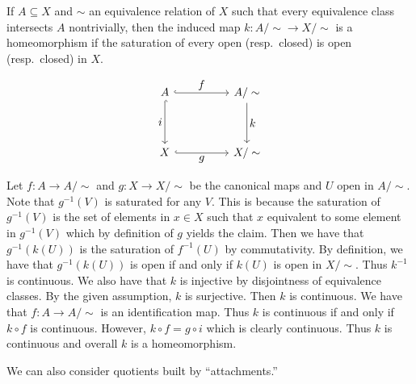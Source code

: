 \documentclass[letterpaper, 11pt, oneside]{book}
\begin{document}
\begin{prop}
  If $A \subseteq X$ and $\sim$ an equivalence relation of $X$ such that every equivalence class intersects $A$ nontrivially, then the induced map $k\colon A / \sim \to X / \sim$ is a homeomorphism if the saturation of every open (resp.\ closed) is open (resp.\ closed) in $X$.
\end{prop}
\begin{pf}
  \begin{figure}[h]
  \centering
  \[
    \begin{tikzcd}[every label/.append style={font=\normalsize}]
      A && {A/\sim} \\
      \\
      X && {X/\sim}
      \arrow["f", hook, from=1-1, to=1-3]
      \arrow["k", from=1-3, to=3-3]
      \arrow["g"', hook, from=3-1, to=3-3]
      \arrow["i"', hook, from=1-1, to=3-1]
    \end{tikzcd}
  \]
  \addtocounter{figure}{1}
  \end{figure}
  Let $f\colon A \to A / \sim$ and $g\colon X \to X / \sim$ be the canonical maps and $U$ open in $A / \sim$.
  Note that $g^{-1}(V)$ is saturated for any $V$.
  This is because the saturation of $g^{-1}(V)$ is the set of elements in $x \in X$ such that $x$ equivalent to some element in $g^{-1}(V)$ which by definition of $g$ yields the claim.
  Then we have that $g^{-1}(k(U))$ is the saturation of $f^{-1}(U)$ by commutativity.
  By definition, we have that $g^{-1}(k(U))$ is open if and only if $k(U)$ is open in $X / \sim$.
  Thus $k^{-1}$ is continuous.
  We also have that $k$ is injective by disjointness of equivalence classes.
  By the given assumption, $k$ is surjective.
  Then $k$ is continuous.
  We have that $f\colon A \to A / \sim$ is an identification map.
  Thus $k$ is continuous if and only if $k \circ f$ is continuous.
  However, $k \circ f = g \circ i$ which is clearly continuous.
  Thus $k$ is continuous and overall $k$ is a homeomorphism.
\end{pf}

We can also consider quotients built by ``attachments.''
\end{document}

